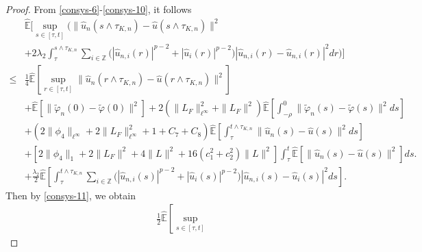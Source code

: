 \documentclass[11pt]{article}
\numberwithin{equation}{section}
\theoremstyle{plain}
\begin{document}
\begin{proof}
  From \eqref{consys-6}-\eqref{consys-10}, it follows
  \begin{align}\label{consys-11}
         & \widehat{\mathbb{E}}
              \Big[ \sup_{s \in [\tau, t]}
                    \Big( \|\hat{u}_n(s \wedge \tau_{K,n}) - \hat{u}(s \wedge \tau_{K,n})\|^2 \nonumber\\
         &          +  2\lambda_2 \int_{\tau}^{s \wedge \tau_{K,n}}
                         \sum_{i \in \mathbb{Z}}
                            \Big( |\hat{u}_{n,i}(r)|^{p-2} + |\hat{u}_{i}(r)|^{p-2} \Big) |\hat{u}_{n,i}(r) - \hat{u}_{n,i}(r)|^2 dr \Big)
              \Big]  \nonumber\\
    \le & \frac{1}{4} \widehat{\mathbb{E}}
              \left[ \sup_{r \in [\tau, t]}
                          \| \hat{u}_n(r \wedge \tau_{K,n}) - \hat{u}(r \wedge \tau_{K,n}) \|^2
              \right]  \nonumber\\
         & + \widehat{\mathbb{E}}[\| \widetilde{\varphi}_n(0) - \widetilde{\varphi}(0)\|^2]
           + 2 \left( \|L_F\|_{\ell^\infty}^2 + \|L_F\|^2 \right)
               \widehat{\mathbb{E}}
                  \left[ \int_{-\rho}^{0}
                            \|{\widetilde{\varphi}}_n(s) - \widetilde{\varphi}(s)\|^2 ds
                  \right]  \nonumber\\
         & + \left( 2 \|\phi_4\|_{\ell^\infty}
                    + 2 \|L_F\|_{\ell^\infty}^2 + 1
                    +C_7
                    +C_8 
             \right)
             \widehat{\mathbb{E}}
                      \left[ \int_{\tau}^{t \wedge \tau_{K,n}}
                                \|\hat{u}_{n}(s) - \hat{u}(s)\|^2 ds
                      \right]  \nonumber\\
         & + \left[ 2 \|\phi_4\|_1
                    + 2 \|L_F\|^2
                    + 4 \| L \|^2 + 16 \left( c_1^2 + c_2^2 \right) \| L \|^2
             \right]
             \int_{\tau}^{t} \widehat{\mathbb{E}} [\|\hat{u}_{n}(s) - \hat{u}(s)\|^2] ds.  \nonumber\\
         & + \frac{\lambda_2}{2} \widehat{\mathbb{E}}
                \left[\int_{\tau}^{t \wedge \tau_{K,n}} \sum_{i \in \mathbb{Z}}
                         \Big( |\hat{u}_{n,i}(s)|^{p-2} + |\hat{u}_i(s)|^{p-2} \Big)
                         |\hat{u}_{n,i}(s) - \hat{u}_i(s)|^2 ds
                \right].
  \end{align}
  Then by \eqref{consys-11}, we obtain
  \begin{align}\label{consys-12}
         & \frac{1}{2} \widehat{\mathbb{E}}
              \left[ \sup_{s \in [\tau, t]}

\end{align}
\end{proof}
\end{document}
